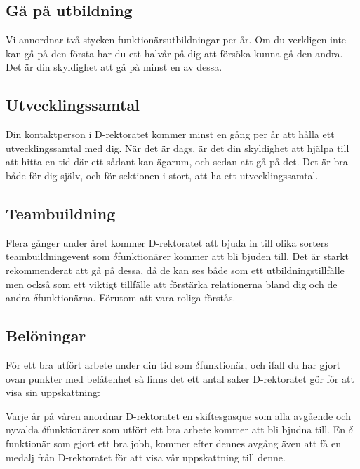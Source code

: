 \documentclass[a4paper,11pt]{article}
\begin{document}
\subsection{Gå på utbildning}
Vi annordnar två stycken funktionärsutbildningar per år. Om du verkligen inte kan gå på den första har du ett halvår på dig att försöka kunna gå den andra. Det är din skyldighet att gå på minst en av dessa.

\subsection{Utvecklingssamtal}
Din kontaktperson i D-rektoratet kommer minst en gång per år att hålla ett utvecklingssamtal med dig. När det är dags, är det din skyldighet att hjälpa till att hitta en tid där ett sådant kan ägarum, och sedan att gå på det. Det är bra både för dig själv, och för sektionen i stort, att ha ett utvecklingssamtal.

\subsection{Teambuildning}
Flera gånger under året kommer D-rektoratet att bjuda in till olika sorters teambuildningevent som $\delta$funktionärer kommer att bli bjuden till. Det är starkt rekommenderat att gå på dessa, då de kan ses både som ett utbildningstillfälle men också som ett viktigt tillfälle att förstärka relationerna bland dig och de andra $\delta$funktionärna. Förutom att vara roliga förstås.

\subsection{Belöningar}
För ett bra utfört arbete under din tid som $\delta$funktionär, och ifall du har gjort ovan punkter med belåtenhet så finns det ett antal saker D-rektoratet gör för att visa sin uppskattning:

Varje år på våren anordnar D-rektoratet en skiftesgasque som alla avgående och nyvalda $\delta$funktionärer som utfört ett bra arbete kommer att bli bjudna till.
En $\delta$funktionär som gjort ett bra jobb, kommer efter dennes avgång även att få en medalj från D-rektoratet för att visa vår uppskattning till denne.
\end{document}
